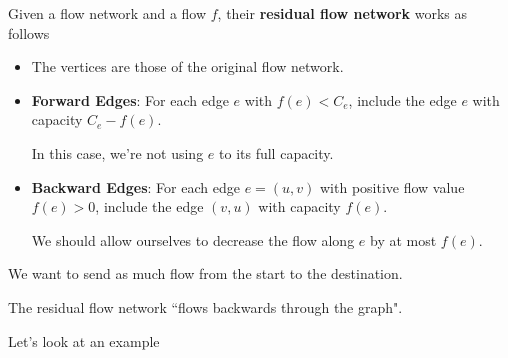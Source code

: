 \documentclass[12pt]{article}
\begin{document}
   {
    Given a flow network and a flow $f$, their {\bf residual flow network} works as
    follows

    \begin{itemize}
      \item The vertices are those of the original flow network.

      \item {\bf Forward Edges}: For each edge $e$ with $f(e) < C_e$, include
        the edge $e$ with capacity $C_e - f(e)$.

        In this case, we're not using $e$ to its full capacity. 

      \item {\bf Backward Edges}: For each edge $e = (u, v)$ with positive flow
        value $f(e) > 0$, include the edge $(v, u)$ with capacity $f(e)$.

        We should allow ourselves to decrease the flow along $e$ by at most
        $f(e)$.
    \end{itemize}
  }


  We want to send as much flow from the start to the destination. 

  The residual flow network ``flows backwards through the graph".

  Let's look at an example
\end{document}
